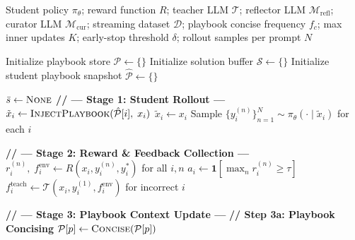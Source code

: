 \documentclass{article}
\begin{document}
\begin{algorithm}[t]
\caption{Streaming RL Training with Playbook Context Updater}
\label{alg:stream-trainer}
\begin{algorithmic}[1]

\REQUIRE Student policy $\pi_\theta$; reward function $R$; teacher LLM $\mathcal{T}$; reflector LLM $\mathcal{M}_{\mathrm{refl}}$; curator LLM $\mathcal{M}_{\mathrm{cur}}$; streaming dataset $\mathcal{D}$; playbook concise frequency $f_c$; max inner updates $K$; early-stop threshold $\delta$; rollout samples per prompt $N$

\STATE Initialize playbook store $\mathcal{P} \leftarrow \{\}$ 
\STATE Initialize solution buffer $\mathcal{S} \leftarrow \{\}$
\STATE Initialize student playbook snapshot $\hat{\mathcal{P}} \leftarrow \{\}$

    \STATE $\bar{s} \leftarrow \textsc{None}$ 
        \STATE \textbf{// --- Stage 1: Student Rollout ---}
                \STATE $\tilde{x}_i \leftarrow \textsc{InjectPlaybook}(\hat{\mathcal{P}}[i],\; x_i)$ 
            \ELSE
                \STATE $\tilde{x}_i \leftarrow x_i$
            \ENDIF
        \ENDFOR
        \STATE Sample $\{y_i^{(n)}\}_{n=1}^{N} \sim \pi_\theta(\cdot \mid \tilde{x}_i)$ for each $i$ 

        \STATE \textbf{// --- Stage 2: Reward \& Feedback Collection ---}
        \STATE $r_i^{(n)},\; f_i^{\text{env}} \leftarrow R(x_i, y_i^{(n)}, y_i^*)$ for all $i, n$ 
        \STATE $a_i \leftarrow \mathbf{1}[\max_n r_i^{(n)} \geq \tau]$ 
            \STATE $f_i^{\text{teach}} \leftarrow \mathcal{T}(x_i, y_i^{(1)}, f_i^{\text{env}})$ for incorrect $i$ 
        \ENDIF

        \STATE \textbf{// --- Stage 3: Playbook Context Update ---}
            \STATE \textbf{// Step 3a: Playbook Concising}
                    \STATE $\mathcal{P}[p] \leftarrow \textsc{Concise}(\mathcal{P}[p])$ 
                \ENDIF
            \ENDFOR


\end{algorithmic}
\end{algorithm}
\end{document}
